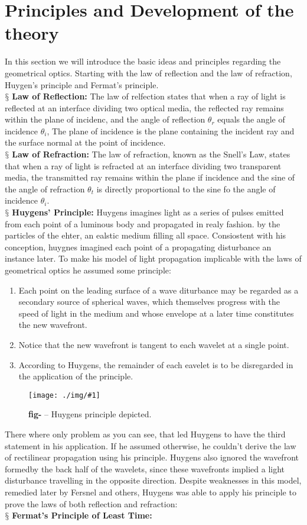 \documentclass[9pt,a4paper, twocolumn]{article}
\newcounter{theo}
\newcounter{figurecounter}
\newcommand{\img}[3]{
    \begin{figure}[h!]
        \centering
        \captionsetup{justification=centering,margin=0cm,labelformat=empty}
        \texttt{[image: ./img/\#1]}
        \label{figure}
        \caption{\small\textbf{fig-\thefigurecounter} -- \textcolor{darkliver}{#3}}
    \end{figure}
    \addtocounter{figurecounter}{1}}
\newcommand{\newpoint}[1]{\ \\ \indent$\mathsection$ \textbf{#1}}
\begin{document}
    \section{Principles and Development of the theory}
        In this section we will introduce the basic ideas and principles regarding the geometrical optics. Starting with the law of reflection and the law of refraction, Huygen's principle and Fermat's principle.
        \newpoint{Law of Reflection:} The law of relfection states that when a ray of light is reflected at an interface dividing two optical media, the reflected ray remains within the plane of incidenc, and the angle of reflection $\theta_r$ equals the angle of incidence $\theta_i$, The plane of incidence is the plane containing the incident ray and the surface normal at the point of incidence.
        \newpoint{Law of Refraction:} The law of refraction, known as the Snell's Law, states that when a ray of light is refracted at an interface dividing two transparent media, the transmitted ray remains within the plane if incidence and the sine of the angle of refraction $\theta_t$ is directly proportional to the sine fo the angle of incidence $\theta_i$.
        \newpoint{Huygens' Principle:} Huygens imagines light as a series of pulses emitted from each point of a luminous body and propagated in realy fashion. by the particles of the ehter, an ealstic medium filling all space. Consiostent with his conception, huygnes imagined each point of a propagating disturbance an instance later. To make his model of light propagation implicable with the laws of geometrical optics he assumed some principle: 
        \begin{enumerate}
            \item Each point on the leading surface of a wave diturbance may be regarded as a secondary source of spherical waves, which themselves progress with the speed of light in the medium and whose envelope at a later time constitutes the new wavefront. 
            \item Notice that the new wavefront is tangent to each wavelet at a single point.
            \item According to Huygens, the remainder of each eavelet is to be disregarded in the application of the principle.
        \end{enumerate}
        \img{huygens}{0.9}{Huygens principle depicted.}
        There where only problem as you can see, that led Huygens to have the third statement in his application. If he assumed otherwise, he couldn't derive the law of rectilinear propagation using his principle. Huygens also ignored the wavefront formedby the back half of the wavelets, since these wavefronts implied a light disturbance travelling in the opposite direction. Despite weaknesses in this model, remedied later by Fersnel and others, Huygens was able to apply his principle to prove the laws of both reflection and refraction:
        \newpoint{Fermat's Principle of Least Time:}
\end{document}
